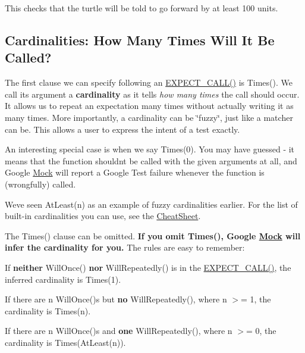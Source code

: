 This checks that the turtle will be told to go forward by at least 100 units.

\subsection*{Cardinalities\+: How Many Times Will It Be Called?}

The first clause we can specify following an {\ttfamily \hyperlink{gmock-spec-builders_8h_a535a6156de72c1a2e25a127e38ee5232}{E\+X\+P\+E\+C\+T\+\_\+\+C\+A\+L\+L()}} is {\ttfamily Times()}. We call its argument a {\bfseries cardinality} as it tells {\itshape how many times} the call should occur. It allows us to repeat an expectation many times without actually writing it as many times. More importantly, a cardinality can be \char`\"{}fuzzy\char`\"{}, just like a matcher can be. This allows a user to express the intent of a test exactly.

An interesting special case is when we say {\ttfamily Times(0)}. You may have guessed -\/ it means that the function shouldn\textquotesingle{}t be called with the given arguments at all, and Google \hyperlink{class_mock}{Mock} will report a Google Test failure whenever the function is (wrongfully) called.

We\textquotesingle{}ve seen {\ttfamily At\+Least(n)} as an example of fuzzy cardinalities earlier. For the list of built-\/in cardinalities you can use, see the \hyperlink{v1__7_2_cheat_sheet_8md}{Cheat\+Sheet}.

The {\ttfamily Times()} clause can be omitted. {\bfseries If you omit {\ttfamily Times()}, Google \hyperlink{class_mock}{Mock} will infer the cardinality for you.} The rules are easy to remember\+:


\begin{DoxyItemize}
\item If {\bfseries neither} {\ttfamily Will\+Once()} {\bfseries nor} {\ttfamily Will\+Repeatedly()} is in the {\ttfamily \hyperlink{gmock-spec-builders_8h_a535a6156de72c1a2e25a127e38ee5232}{E\+X\+P\+E\+C\+T\+\_\+\+C\+A\+L\+L()}}, the inferred cardinality is {\ttfamily Times(1)}.
\item If there are {\ttfamily n Will\+Once()}\textquotesingle{}s but {\bfseries no} {\ttfamily Will\+Repeatedly()}, where {\ttfamily n} $>$= 1, the cardinality is {\ttfamily Times(n)}.
\item If there are {\ttfamily n Will\+Once()}\textquotesingle{}s and {\bfseries one} {\ttfamily Will\+Repeatedly()}, where {\ttfamily n} $>$= 0, the cardinality is {\ttfamily Times(\+At\+Least(n))}.
\end{DoxyItemize}

